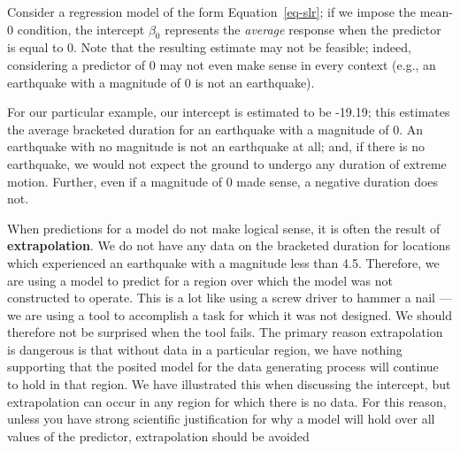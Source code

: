 \documentclass[
  letterpaper,
  DIV=11,
  numbers=noendperiod]{scrreprt}
\theoremstyle{plain}
\theoremstyle{definition}
\theoremstyle{definition}
\theoremstyle{remark}
\begin{document}
\begin{tcolorbox}[enhanced jigsaw, breakable, colback=white, arc=.35mm, coltitle=black, bottomtitle=1mm, titlerule=0mm, colbacktitle=quarto-callout-note-color!10!white, title=\textcolor{quarto-callout-note-color}{\faInfo}\hspace{0.5em}{Interpretation of the Intercept}, left=2mm, opacityback=0, opacitybacktitle=0.6, colframe=quarto-callout-note-color-frame, toptitle=1mm, toprule=.15mm, rightrule=.15mm, bottomrule=.15mm, leftrule=.75mm]

Consider a regression model of the form Equation~\ref{eq-slr}; if we
impose the mean-0 condition, the intercept \(\beta_0\) represents the
\emph{average} response when the predictor is equal to 0. Note that the
resulting estimate may not be feasible; indeed, considering a predictor
of 0 may not even make sense in every context (e.g., an earthquake with
a magnitude of 0 is not an earthquake).

\end{tcolorbox}

For our particular example, our intercept is estimated to be -19.19;
this estimates the average bracketed duration for an earthquake with a
magnitude of 0. An earthquake with no magnitude is not an earthquake at
all; and, if there is no earthquake, we would not expect the ground to
undergo any duration of extreme motion. Further, even if a magnitude of
0 made sense, a negative duration does not.

When predictions for a model do not make logical sense, it is often the
result of \textbf{extrapolation}. We do not have any data on the
bracketed duration for locations which experienced an earthquake with a
magnitude less than 4.5. Therefore, we are using a model to predict for
a region over which the model was not constructed to operate. This is a
lot like using a screw driver to hammer a nail --- we are using a tool
to accomplish a task for which it was not designed. We should therefore
not be surprised when the tool fails. The primary reason extrapolation
is dangerous is that without data in a particular region, we have
nothing supporting that the posited model for the data generating
process will continue to hold in that region. We have illustrated this
when discussing the intercept, but extrapolation can occur in any region
for which there is no data. For this reason, unless you have strong
scientific justification for why a model will hold over all values of
the predictor, extrapolation should be avoided
\end{document}
